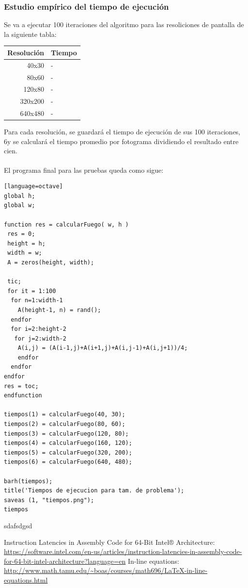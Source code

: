 \documentclass[a4,12pt]{article}
\begin{document}
\subsubsection{Estudio empírico del tiempo de ejecución}

Se va a ejecutar 100 iteraciones del algoritmo para las resoliciones de pantalla de la siguiente tabla:\\
\begin{tabular}{ | r | l |}
\hline
  Resolución & Tiempo \\
\hline
  40x30 & - \\
  80x60 & - \\
  120x80 & - \\
  320x200 & - \\
  640x480 & - \\
\hline
\end{tabular}

Para cada resolución, se guardará el tiempo de ejecución de sus 100 iteraciones, 6y se calculará el tiempo promedio por fotograma dividiendo el resultado entre cien.
\\
\\
El programa final para las pruebas queda como sigue:
\bigskip
\lstset{language=Octave}
\begin{lstlisting}[frame=single][language=octave]
global h;
global w;

function res = calcularFuego( w, h )
 res = 0;
 height = h;
 width = w;
 A = zeros(height, width);

 tic;
 for it = 1:100
  for n=1:width-1
	A(height-1, n) = rand();
  endfor
  for i=2:height-2
   for j=2:width-2
	A(i,j) = (A(i-1,j)+A(i+1,j)+A(i,j-1)+A(i,j+1))/4;
    endfor
  endfor
endfor
res = toc;
endfunction

tiempos(1) = calcularFuego(40, 30);
tiempos(2) = calcularFuego(80, 60);
tiempos(3) = calcularFuego(120, 80);
tiempos(4) = calcularFuego(160, 120);
tiempos(5) = calcularFuego(320, 200);
tiempos(6) = calcularFuego(640, 480);

barh(tiempos);
title('Tiempos de ejecucion para tam. de problema');
saveas (1, "tiempos.png");
tiempos
\end{lstlisting}
sdafsdgsd

\begin{thebibliography}{99}
 Instruction Latencies in Assembly Code for 64-Bit Intel® Architecture:\\ \url{https://software.intel.com/en-us/articles/instruction-latencies-in-assembly-code-for-64-bit-intel-architecture?language=en}
 In-line equations:\\ \url{http://www.math.tamu.edu/~boas/courses/math696/LaTeX-in-line-equations.html}
\end{thebibliography}
\end{document}
